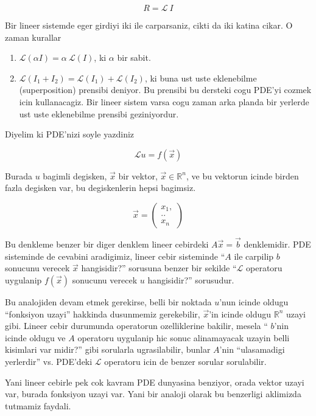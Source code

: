 \documentclass[12pt,fleqn]{article}\usepackage{../common}
\begin{document}
\[ R = \mathcal{L} \ I \]

Bir lineer sistemde eger girdiyi iki ile carparsaniz, cikti da iki katina
cikar. O zaman kurallar

\begin{enumerate}

   \item $\mathcal{L}(\alpha I) = \alpha \ \mathcal{L}(I)$, ki $\alpha$ bir sabit.

   \item $\mathcal{L}(I_1 + I_2) = \mathcal{L}(I_1) + \mathcal{L}(I_2)$, ki buna ust uste eklenebilme
     (superposition) prensibi deniyor. Bu prensibi bu dersteki cogu PDE'yi
     cozmek icin kullanacagiz. Bir lineer sistem varsa cogu zaman arka
     planda bir yerlerde ust uste eklenebilme prensibi geziniyordur. 

\end{enumerate}

Diyelim ki PDE'nizi soyle yazdiniz

\[\mathcal{L}u = f(\vec{x}) \]

Burada $u$ bagimli degisken, $\vec{x}$ bir vektor, $\vec{x} \in \mathbb{R} ^n$, ve
bu vektorun icinde birden fazla degisken var, bu degiskenlerin hepsi
bagimsiz.

\[ 
\vec{x} = 
\left(\begin{array}{r}
x_1,\\
.. \\
x_n
\end{array}\right)
 \]

Bu denkleme benzer bir diger denklem lineer cebirdeki $A\vec{x} = \vec{b}$
denklemidir.  PDE sisteminde de cevabini aradigimiz, lineer cebir
sisteminde ``$A$ ile carpilip $b$ sonucunu verecek $\vec{x}$ hangisidir?''
sorusuna benzer bir sekilde ``$\mathcal{L}$ operatoru uygulanip $f(\vec{x})$
sonucunu verecek $u$ hangisidir?'' sorusudur.

Bu analojiden devam etmek gerekirse, belli bir noktada $u$'nun icinde
oldugu ``fonksiyon uzayi'' hakkinda dusunmemiz gerekebilir, $\vec{x}$'in
icinde oldugu $\mathbb{R}^n$ uzayi gibi. Lineer cebir durumunda operatorun
ozelliklerine bakilir, mesela `` $b$'nin icinde oldugu ve $A$ operatoru
uygulanip hic sonuc alinamayacak uzayin belli kisimlari var
midir?'' gibi sorularla ugrasilabilir, bunlar $A$'nin ``ulasamadigi
yerlerdir'' vs. PDE'deki $\mathcal{L}$ operatoru icin de benzer sorular sorulabilir. 

Yani lineer cebirle pek cok kavram PDE dunyasina benziyor, orada vektor
uzayi var, burada fonksiyon uzayi var. Yani bir analoji olarak bu
benzerligi aklimizda tutmamiz faydali. 
\end{document}
